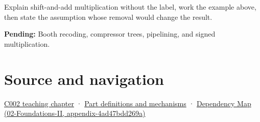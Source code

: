 Explain shift-and-add multiplication without the label, work the example above, then state the assumption whose removal would change the result.

\textbf{Pending:} Booth recoding, compressor trees, pipelining, and signed multiplication.

\section{Source and navigation}\label{appendix-a65290d66ed9-source-and-navigation}

\href{Continuous\%20Notes/Computing\%20Foundations\%20-\%20From\%20Bits\%20to\%20C++\%20and\%20Systems\%20APIs\#Arithmetic\%20becomes\%20a\%20policy}{C002 teaching chapter} · \hyperref[appendix-fd090d982a15]{Part definitions and mechanisms} · \href{../02-Foundations-II/main.pdf\#nameddest=appendix-4ad47bdd269a}{Dependency Map (02-Foundations-II, appendix-4ad47bdd269a)}
